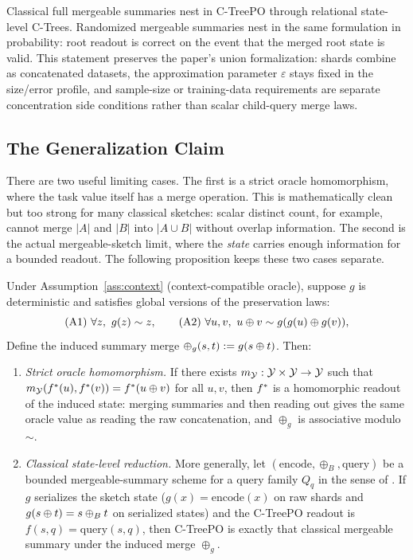 Classical full mergeable summaries nest in C-TreePO through relational
state-level C-Trees. Randomized mergeable summaries nest in the same
formulation in probability: root readout is correct on the event that the
merged root state is valid. This statement preserves the paper's union
formalization: shards combine as concatenated datasets, the approximation
parameter $\varepsilon$ stays fixed in the size/error profile, and
sample-size or training-data requirements are separate concentration
side conditions rather than scalar child-query merge laws.

\subsection{The Generalization Claim}

There are two useful limiting cases. The first is a strict oracle
homomorphism, where the task value itself has a merge operation. This is
mathematically clean but too strong for many classical sketches: scalar
distinct count, for example, cannot merge $|A|$ and $|B|$ into $|A\cup B|$
without overlap information. The second is the actual mergeable-sketch limit,
where the \emph{state} carries enough information for a bounded readout. The
following proposition keeps these two cases separate.

\begin{proposition}\label{prop:mergeable-reduction}
Under Assumption~\ref{ass:context} (context-compatible oracle), suppose $g$ is deterministic and satisfies global versions of the preservation laws:
\[
\text{(A1)}\ \forall z,\ g(z) \sim z,\qquad
\text{(A2)}\ \forall u,v,\ u \oplus v \sim g(g(u)\oplus g(v)),
\]
Define the induced summary merge $\oplus_g(s,t):=g(s\oplus t)$. Then:
\begin{enumerate}[nosep]
\item \emph{Strict oracle homomorphism.} If there exists
$m_{\mathcal{Y}}:\mathcal{Y}\times\mathcal{Y}\to\mathcal{Y}$ such that
$m_{\mathcal{Y}}(f^\ast(u),f^\ast(v))=f^\ast(u\oplus v)$ for all $u,v$, then
$f^\ast$ is a homomorphic readout of the induced state: merging summaries and
then reading out gives the same oracle value as reading the raw concatenation,
and $\oplus_g$ is associative modulo $\sim$.
\item \emph{Classical state-level reduction.} More generally, let
$(\mathrm{encode},\oplus_B,\mathrm{query})$ be a bounded mergeable-summary
scheme for a query family $Q_q$ in the sense of
\citet{Agarwal2013MergeableTODS}. If $g$ serializes the sketch state
($g(x)=\mathrm{encode}(x)$ on raw shards and
$g(s\oplus t)=s\oplus_B t$ on serialized states) and the C-TreePO readout is
$f(s,q)=\mathrm{query}(s,q)$, then C-TreePO is exactly that classical
mergeable summary under the induced merge $\oplus_g$.
\end{enumerate}
\end{proposition}


